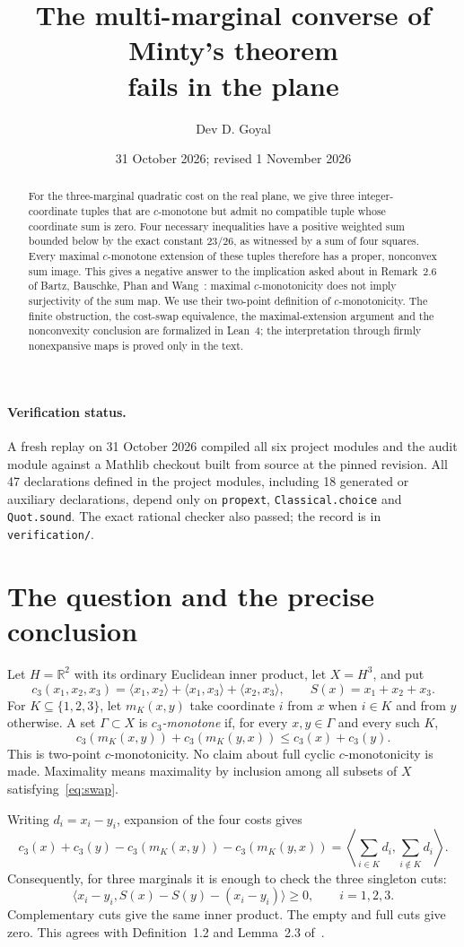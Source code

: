 \documentclass[11pt]{article}
\title{\textbf{The multi-marginal converse of Minty's theorem\\fails in the plane}}
\author{Dev D. Goyal}
\date{31 October 2026; revised 1 November 2026}
\newcommand{\replaystatus}{A fresh replay on 31 October 2026 compiled all six project modules and the audit module against a Mathlib checkout built from source at the pinned revision. All 47 declarations defined in the project modules, including 18 generated or auxiliary declarations, depend only on \texttt{propext}, \texttt{Classical.choice} and \texttt{Quot.sound}. The exact rational checker also passed; the record is in \texttt{verification/}.}
\newcommand{\R}{\mathbb R}
\newcommand{\ip}[2]{\langle #1,#2\rangle}
\begin{document}
\maketitle
\begin{abstract}
For the three-marginal quadratic cost on the real plane, we give three
integer-coordinate tuples that are $c$-monotone but admit
no compatible tuple whose coordinate sum is zero. Four necessary
inequalities have a positive weighted sum bounded below by the exact
constant $23/26$, as witnessed by a sum of four squares. Every maximal
$c$-monotone extension of these tuples therefore has a proper, nonconvex
sum image. This gives a negative answer to the implication asked about in
Remark~2.6 of Bartz, Bauschke, Phan and Wang~\cite{BBPW}: maximal
$c$-monotonicity does not imply surjectivity of the sum map. We use their
two-point definition of $c$-monotonicity. The finite obstruction, the
cost-swap equivalence, the maximal-extension argument and the nonconvexity
conclusion are formalized in Lean~4; the interpretation through firmly
nonexpansive maps is proved only in the text.
\end{abstract}

\paragraph{Verification status.} \replaystatus

\section{The question and the precise conclusion}

Let $H=\R^2$ with its ordinary Euclidean inner product, let $X=H^3$, and put
\[
 c_3(x_1,x_2,x_3)=\ip{x_1}{x_2}+\ip{x_1}{x_3}+\ip{x_2}{x_3},
 \qquad S(x)=x_1+x_2+x_3.
\]
For $K\subseteq\{1,2,3\}$, let $m_K(x,y)$ take coordinate $i$ from $x$ when
$i\in K$ and from $y$ otherwise. A set $\Gamma\subset X$ is
\emph{$c_3$-monotone} if, for every $x,y\in\Gamma$ and every such $K$,
\begin{equation}\label{eq:swap}
 c_3(m_K(x,y))+c_3(m_K(y,x))\le c_3(x)+c_3(y).
\end{equation}
This is two-point $c$-monotonicity. No claim about full cyclic
$c$-monotonicity is made. Maximality means maximality by inclusion among
all subsets of $X$ satisfying~\eqref{eq:swap}.

Writing $d_i=x_i-y_i$, expansion of the four costs gives
\begin{equation}\label{eq:cut}
 c_3(x)+c_3(y)-c_3(m_K(x,y))-c_3(m_K(y,x))
 =\left\langle\sum_{i\in K}d_i,\sum_{i\notin K}d_i\right\rangle.
\end{equation}
Consequently, for three marginals it is enough to check the three singleton
cuts:
\begin{equation}\label{eq:single}
 \ip{x_i-y_i}{S(x)-S(y)-(x_i-y_i)}\ge0,\qquad i=1,2,3.
\end{equation}
Complementary cuts give the same inner product. The empty and full cuts
give zero. This agrees with Definition~1.2 and Lemma~2.3 of~\cite{BBPW}.
\end{document}
